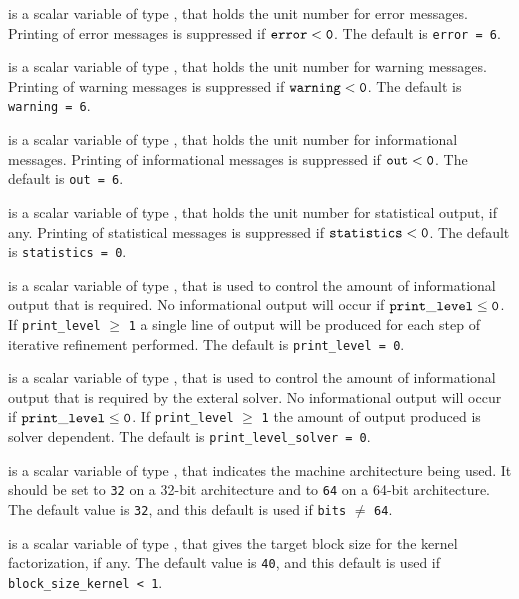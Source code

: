 \documentclass{galahad}
\begin{document}
\begin{description}

 is a scalar variable of type \integer, that holds the
unit number for error messages.
Printing of error messages is suppressed if ${\tt error} < {\tt 0}$.
The default is {\tt error = 6}.

 is a scalar variable of type \integer, that holds the
unit number for warning messages.
Printing of warning messages is suppressed if ${\tt warning} < {\tt 0}$.
The default is {\tt warning = 6}.

 is a scalar variable of type \integer, that holds the
unit number for informational messages.
Printing of informational messages is suppressed if ${\tt out} < {\tt 0}$.
The default is {\tt out = 6}.

 is a scalar variable of type \integer, that holds the
unit number for statistical output, if any.
Printing of statistical messages is suppressed if ${\tt statistics} < {\tt 0}$.
The default is {\tt statistics = 0}.

 is a scalar variable of type \integer,
that is used
to control the amount of informational output that is required. No
informational output will occur if ${\tt print\_level} \leq {\tt 0}$. If
{\tt print\_level} $\geq$ {\tt 1} a single line of output will be produced
for each step of iterative refinement performed.
The default is {\tt print\_level = 0}.

 is a scalar variable of type \integer,
that is used
to control the amount of informational output that is required by the exteral
solver. No
informational output will occur if ${\tt print\_level} \leq {\tt 0}$. If
{\tt print\_level} $\geq$ {\tt 1} the amount of output produced is solver
dependent.
The default is {\tt print\_level\_solver = 0}.

 is a scalar variable of type \integer,
that indicates the machine architecture being used.
It should be set to {\tt 32} on a  32-bit architecture and to {\tt 64}
on a 64-bit architecture. The default value is {\tt 32},
and this default is used if {\tt bits} $\neq$ {\tt 64}.

 is a scalar variable of type \integer,
that gives the target block size for the kernel factorization, if any.
The default value is {\tt 40},
and this default is used if {\tt block\_size\_kernel < 1}.


\end{description}
\end{document}
